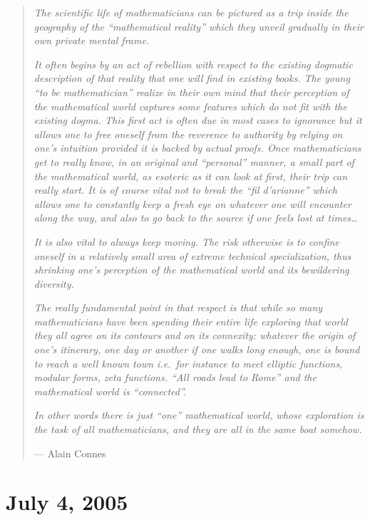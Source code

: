 \documentclass{article}
\begin{document}
\begin{quote}
\emph{The scientific life of mathematicians can be pictured as a trip
inside the geography of the ``mathematical reality'' which they unveil
gradually in their own private mental frame.}

\emph{It often begins by an act of rebellion with respect to the
existing dogmatic description of that reality that one will find in
existing books. The young ``to be mathematician'' realize in their own
mind that their perception of the mathematical world captures some
features which do not fit with the existing dogma. This first act is
often due in most cases to ignorance but it allows one to free oneself
from the reverence to authority by relying on one's intuition provided
it is backed by actual proofs. Once mathematicians get to really know,
in an original and ``personal'' manner, a small part of the mathematical
world, as esoteric as it can look at first, their trip can really start.
It is of course vital not to break the ``fil d'arianne'' which allows
one to constantly keep a fresh eye on whatever one will encounter along
the way, and also to go back to the source if one feels lost at
times\ldots{}}

\emph{It is also vital to always keep moving. The risk otherwise is to
confine oneself in a relatively small area of extreme technical
specialization, thus shrinking one's perception of the mathematical
world and its bewildering diversity.}

\emph{The really fundamental point in that respect is that while so many
mathematicians have been spending their entire life exploring that world
they all agree on its contours and on its connexity: whatever the origin
of one's itinerary, one day or another if one walks long enough, one is
bound to reach a well known town i.e.~for instance to meet elliptic
functions, modular forms, zeta functions. ``All roads lead to Rome'' and
the mathematical world is ``connected''.}

\emph{In other words there is just ``one'' mathematical world, whose
exploration is the task of all mathematicians, and they are all in the
same boat somehow.}

--- Alain Connes
\end{quote}



\hypertarget{week219}{%
\section{July 4, 2005}\label{week219}}
\end{document}
